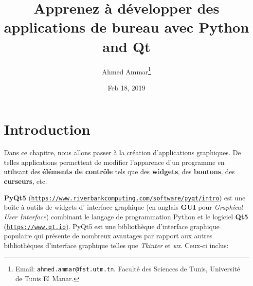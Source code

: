 \documentclass[%
oneside,                 %
final,                   %
10pt,french]{article}
\begin{document}

\newcommand{\exercisesection}[1]{\subsection*{#1}}






\title{Apprenez à développer des applications de bureau avec Python and Qt}


\author{Ahmed Ammar\footnote{Email: \texttt{ahmed.ammar@fst.utm.tn}. Faculté des Sciences de Tunis, Université de Tunis El Manar.}}


\date{Feb 18, 2019}
\maketitle

\tableofcontents


\vspace{1cm} %




\section{Introduction}
Dans ce chapitre, nous allons passer à la création d’applications graphiques. De telles applications permettent de modifier l'apparence d'un programme en utilisant des \textbf{éléments de contrôle} tels que des \textbf{widgets}, des \textbf{boutons}, des \textbf{curseurs}, etc.

\textbf{PyQt5} (\href{{https://www.riverbankcomputing.com/software/pyqt/intro}}{\nolinkurl{https://www.riverbankcomputing.com/software/pyqt/intro}}) est une boîte à outils de widgets d' interface graphique (en anglais \textbf{GUI} pour \emph{Graphical User Interface}) combinant le langage de programmation Python et le logiciel \textbf{Qt5} (\href{{https://www.qt.io}}{\nolinkurl{https://www.qt.io}}). PyQt5 est une bibliothèque d'interface graphique populaire qui présente de nombreux avantages par rapport aux autres bibliothèques d'interface graphique telles que \emph{Tkinter} et \emph{wx}. Ceux-ci inclus:
\end{document}
